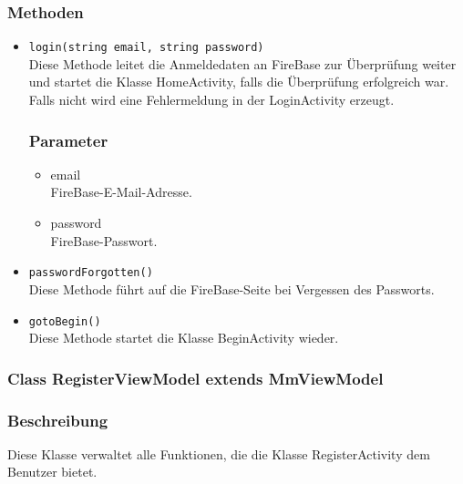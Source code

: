 \documentclass[a4paper]{scrreprt}
\begin{document}
\subsubsection*{Methoden}
\begin{addmargin}[25pt]{0pt}
\begin{itemize}

\item \texttt{login(string email, string password)}\\
	Diese Methode leitet die Anmeldedaten an FireBase zur Überprüfung weiter und startet die Klasse HomeActivity, falls die Überprüfung erfolgreich war. Falls nicht wird eine Fehlermeldung in der LoginActivity erzeugt.
	\subsubsection*{Parameter}
	\begin{itemize}
	\item email \\
		FireBase-E-Mail-Adresse.
	\item password \\
		FireBase-Passwort.
	\end{itemize}

\item \texttt{passwordForgotten()}\\
	Diese Methode führt auf die FireBase-Seite bei Vergessen des Passworts.

\item \texttt{gotoBegin()}\\
	Diese Methode startet die Klasse BeginActivity wieder.

\end{itemize}
\end{addmargin}	



\subsubsection{Class RegisterViewModel extends MmViewModel}
\subsubsection*{Beschreibung}
Diese Klasse verwaltet alle Funktionen, die die Klasse RegisterActivity dem Benutzer bietet.
\end{document}
